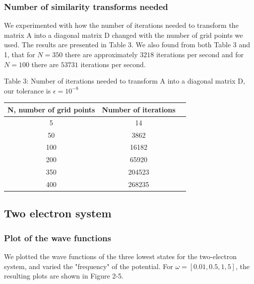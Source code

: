 \documentclass[norsk,a4paper,12pt]{article}
\begin{document}
\subsubsection{Number of similarity transforms needed}
\par
\vspace{2mm}

We experimented with how the number of iterations needed to transform the matrix A into a diagonal matrix D changed with the number of grid points we used. The results are presented in Table 3. We also found from both Table 3 and 1, that for $N=350$ there are approximately $3218$ iterations per second and for $N=100$ there are $53731$ iterations per second.
\par
\vspace{3mm}


Table 3: Number of iterations needed to transform A into a diagonal matrix D, our tolerance is $\epsilon = 10^{-8}$
\par
\vspace{3mm}
\begin{tabular}{|c|c|c|}\hline
     {\bf N, number of grid points} & {\bf Number of iterations}\\ \hline
     5 & 14\\
     50 & 3862\\
     100 & 16182\\
     200 & 65920\\
     350 & 204523 \\ 
     400 & 268235\\\hline
\end{tabular}\par
  

\par
\vspace{5mm}

\subsection{Two electron system}
\par
\vspace{3mm}

\subsubsection{Plot of the wave functions}
\par
\vspace{3mm}

We plotted the wave functions of the three lowest states for the two-electron system, and varied the "frequency" of the potential. For $\omega = [0.01, 0.5, 1, 5]$, the resulting plots are shown in Figure 2-5. 
\par
\vspace{3mm}
\end{document}
